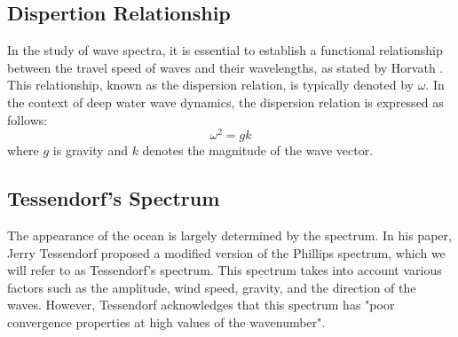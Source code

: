 \subsection{Dispertion Relationship}
In the study of wave spectra, it is essential to establish a functional relationship between the travel speed of waves and their wavelengths, as stated by Horvath \cite{horvath2015}. This relationship, known as the dispersion relation, is typically denoted by $\omega$. In the context of deep water wave dynamics, the dispersion relation is expressed as follows:
$$
\omega^2 = gk
$$
where $g$ is gravity and $k$ denotes the magnitude of the wave vector.

\subsection{Tessendorf's Spectrum}
The appearance of the ocean is largely determined by the spectrum. In his paper, Jerry Tessendorf \cite{tessendorf2001} proposed a modified version of the Phillips spectrum, which we will refer to as Tessendorf's spectrum. This spectrum takes into account various factors such as the amplitude, wind speed, gravity, and the direction of the waves. However, Tessendorf acknowledges that this spectrum has "poor convergence properties at high values of the wavenumber".

